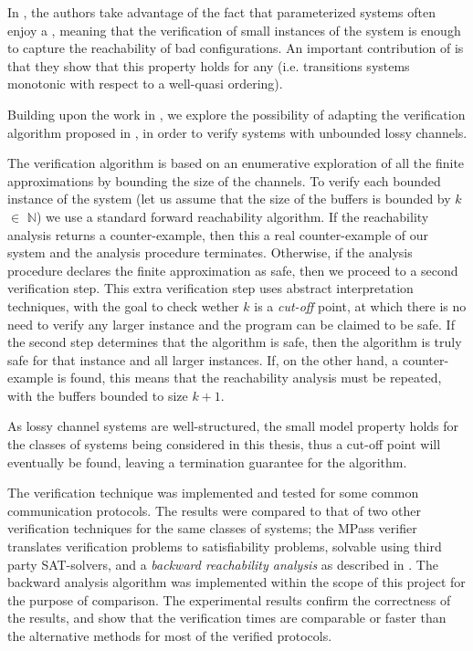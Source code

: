 In \cite{parosh}, the authors take advantage of the fact that parameterized systems often enjoy a , meaning that the verification of small instances of the system is enough to capture the reachability of bad configurations. An important contribution of \cite{parosh} is that they show that this property holds for any \cite{abdulla2010} (i.e. transitions systems monotonic with respect to a well-quasi ordering).


Building upon the work in \cite{parosh}, we explore the possibility of adapting the verification algorithm proposed in \cite{parosh}, in order to verify systems with unbounded lossy channels.

The verification algorithm is based on an enumerative exploration of all the finite approximations by bounding the size of the channels. To verify each bounded instance of the system (let us assume that the size of the buffers is bounded by $k$ $\in$ $\mathds{N}$) we use a standard forward reachability algorithm. If the reachability analysis returns a counter-example, then this a real counter-example of our system and the analysis procedure terminates. Otherwise, if the analysis procedure declares the finite approximation as safe, then we proceed to a second verification step. This extra verification step uses abstract interpretation techniques\cite{cousot1977}\cite{cousot1979}, with the goal to check wether $k$ is a \emph{cut-off} point, at which there is no need to verify any larger instance and the program can be claimed to be safe. If the second step determines that the algorithm is safe, then the algorithm is truly safe for that instance and all larger instances. If, on the other hand, a counter-example is found, this means that the reachability analysis must be repeated, with the buffers bounded to size $k+1$.

As lossy channel systems are well-structured, the small model property holds for the classes of systems being considered in this thesis, thus a cut-off point will eventually be found, leaving a termination guarantee for the algorithm.

The verification technique was implemented and tested for some common communication protocols. The results were compared to that of two other verification techniques for the same classes of systems; the MPass\cite{mpass} verifier translates verification problems to satisfiability problems, solvable using third party SAT-solvers, and a \emph{backward reachability analysis} as described in \cite{287591}. The backward analysis algorithm was implemented within the scope of this project for the purpose of comparison. The experimental results confirm the correctness of the results, and show that the verification times are comparable or faster than the alternative methods for most of the verified protocols.

